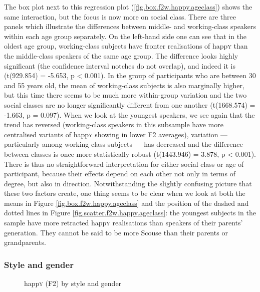 The box plot next to this regression plot (\ref{fig.box.f2w.happy.ageclass}) shows the same interaction, but the focus is now more on social class.
There are three panels which illustrate the differences between middle- and working-class speakers within each age group separately.
On the left-hand side one can see that in the oldest age group, working-class subjects have fronter realisations of happ\textsc{y} than the middle-class speakers of the same age group.
The difference looks highly significant (the confidence interval notches do not overlap), and indeed it is (t(929.854) = -5.653, p < 0.001).
In the group of participants who are between 30 and 55 years old, the mean of working-class subjects is also marginally higher, but this time there seems to be much more within-group variation and the two social classes are no longer significantly different from one another (t(1668.574) = -1.663, p = 0.097).
When we look at the youngest speakers, we see again that the trend has reversed (working-class speakers in this subsample have more centralised variants of happ\textsc{y} showing in lower F2 averages), variation --- particularly among working-class subjects --- has decreased and the difference between classes is once more statistically robust (t(1443.946) = 3.878, p < 0.001).
There is thus no straightforward interpretation for either social class or age of participant, because their effects depend on each other not only in terms of degree, but also in direction.
Notwithstanding the slightly confusing picture that these two factors create, one thing seems to be clear when we look at both the means in Figure \ref{fig.box.f2w.happy.ageclass} and the position of the dashed and dotted lines in Figure \ref{fig.scatter.f2w.happy.ageclass}: the youngest subjects in the sample have more retracted happ\textsc{y} realisations than speakers of their parents' generation.
They cannot be said to be more Scouse than their parents or grandparents.

\subsubsection{Style and gender}
\label{sec.prod.res.vow.happy.f2.stylegender}

\begin{figure}[h!]
	\centering
		\resizebox{.49\linewidth}{!}{} 
	\caption{happ\textsc{y} (F2) by style and gender}
	\label{fig.box.f2w.happy.stylegender}
\end{figure}

